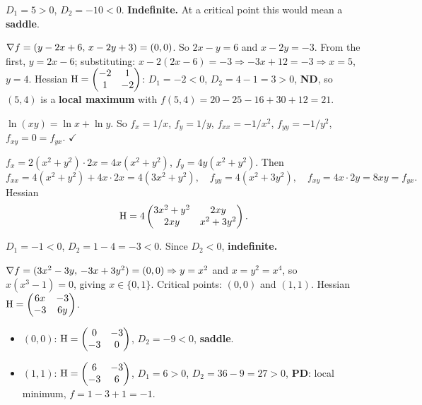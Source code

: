 \begin{solutions}
  \item $D_1 = 5 > 0$, $D_2 = -10 < 0$. \textbf{Indefinite.} At a critical
        point this would mean a \textbf{saddle}.

  \item $\nabla f = (y-2x+6,\,x-2y+3) = (0,0)$. So $2x-y=6$ and
        $x-2y=-3$. From the first, $y=2x-6$; substituting:
        $x-2(2x-6)=-3 \Rightarrow -3x+12=-3 \Rightarrow x=5$, $y=4$.
        Hessian $\operatorname{H} = \begin{pmatrix}-2&1\\1&-2\end{pmatrix}$:
        $D_1=-2<0$, $D_2=4-1=3>0$, \textbf{ND}, so $(5,4)$ is a
        \textbf{local maximum} with $f(5,4) = 20-25-16+30+12 = 21$.

  \item $\ln(xy) = \ln x + \ln y$. So $f_x = 1/x$, $f_y = 1/y$,
        $f_{xx} = -1/x^{2}$, $f_{yy} = -1/y^{2}$, $f_{xy} = 0 = f_{yx}$.
        \; $\checkmark$

  \item $f_x = 2(x^{2}+y^{2})\cdot2x = 4x(x^{2}+y^{2})$,
        $f_y = 4y(x^{2}+y^{2})$. Then
        \[
          f_{xx} = 4(x^{2}+y^{2})+4x\cdot2x = 4(3x^{2}+y^{2}), \quad
          f_{yy} = 4(x^{2}+3y^{2}), \quad
          f_{xy} = 4x\cdot2y = 8xy = f_{yx} .
        \]
        Hessian
        \[
          \operatorname{H} = 4\begin{pmatrix}3x^{2}+y^{2}&2xy\\2xy&x^{2}+3y^{2}\end{pmatrix} .
        \]

  \item $D_1 = -1 < 0$, $D_2 = 1 - 4 = -3 < 0$. Since $D_2<0$,
        \textbf{indefinite.}

  \item $\nabla f = (3x^{2}-3y,\,-3x+3y^{2}) = (0,0) \Rightarrow y=x^{2}$
        and $x=y^{2}=x^{4}$, so $x(x^{3}-1)=0$, giving $x\in\{0,1\}$.
        Critical points: $(0,0)$ and $(1,1)$. Hessian
        $\operatorname{H} = \begin{pmatrix}6x&-3\\-3&6y\end{pmatrix}$.
        \begin{itemize}
          \item $(0,0)$: $\operatorname{H} = \begin{pmatrix}0&-3\\-3&0\end{pmatrix}$,
                $D_2=-9<0$, \textbf{saddle}.
          \item $(1,1)$: $\operatorname{H} = \begin{pmatrix}6&-3\\-3&6\end{pmatrix}$,
                $D_1=6>0$, $D_2=36-9=27>0$, \textbf{PD}: local minimum,
                $f=1-3+1=-1$.
        \end{itemize}


\end{solutions}
